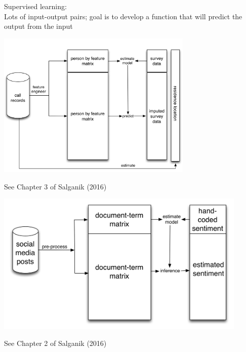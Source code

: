 \documentclass[aspectratio=169]{beamer}
\def\vf{\vfill}
\begin{document}
\begin{frame}

Supervised learning:\\
Lots of input-output pairs; goal is to develop a function that will predict the output from the input

\end{frame}
\begin{frame}

\begin{center}
\includegraphics[width=0.7\textwidth]{figures/blumenstock_predicting_2015_schematic_6}
\end{center}
\vf
See Chapter 3 of Salganik (2016)
\end{frame}
\begin{frame}

\begin{center}
\includegraphics[width=0.9\textwidth]{figures/king_how_2013_schematic}
\end{center}
\vf
See Chapter 2 of Salganik (2016)
\end{frame}
\end{document}

